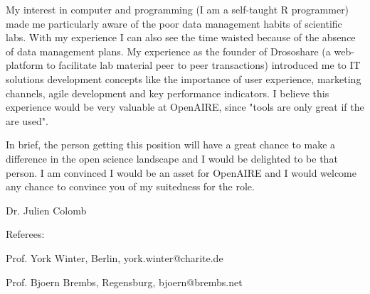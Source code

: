 My interest in computer and programming (I am a self-taught R programmer) made me particularly aware of the poor data management  habits of scientific labs. With my experience I can also see the time waisted because of the absence of data management plans. My experience as the founder of Drososhare (a web-platform to facilitate lab material peer to peer transactions) introduced me to IT solutions development concepts like the importance of user experience, marketing channels, agile development and key performance indicators. I believe this experience would be very valuable at OpenAIRE, since "tools are only great if the are used". 

In brief, the person getting this position will have a great chance to make a difference in the open science landscape and I would be delighted to be that person. I am convinced I would be an asset for OpenAIRE and I would welcome any chance to convince you of my suitedness for the role. 

Dr. Julien Colomb


\vspace {1.cm} 

Referees:

Prof. York Winter, Berlin, york.winter@charite.de
 
 
Prof. Bjoern Brembs, Regensburg, bjoern@brembs.net
